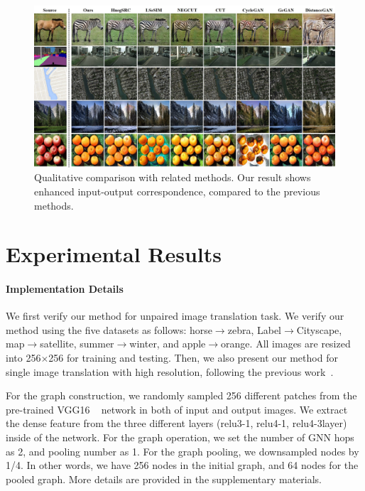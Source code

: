 \documentclass[letterpaper]{article} %
\begin{document}
\begin{figure}[!t]
	\centering
	\includegraphics[width=0.97\linewidth]{figs/result_aaai_2.jpg}
	\caption{Qualitative comparison with related methods. Our result shows enhanced input-output correspondence, compared to the previous methods.}
	\label{fig:result1}
\end{figure}




\section{Experimental Results}



\paragraph{Implementation Details}
We first verify our method for unpaired image translation task.
We verify our method using the five datasets as follows: horse$\rightarrow$zebra, Label$\rightarrow$Cityscape, map$\rightarrow$satellite, summer$\rightarrow$winter, and {apple$\rightarrow$orange}. All images are resized into 256$\times$256 for training and testing. Then, we also present our method for single image translation with high resolution, following the previous work~\cite{cut}.

For the graph construction, we randomly sampled 256 different patches from the pre-trained VGG16 ~\cite{vgg} network in both of input and output images. We extract the dense feature from the three different layers (relu3-1, relu4-1, relu4-3layer) inside of the network. For the graph operation, we set the number of GNN hops as 2, and pooling number as 1. For the graph pooling, we downsampled nodes by 1/4. In other words, we have 256 nodes in the initial graph, and 64 nodes for the pooled graph.
More details are provided in the supplementary materials.
\end{document}
